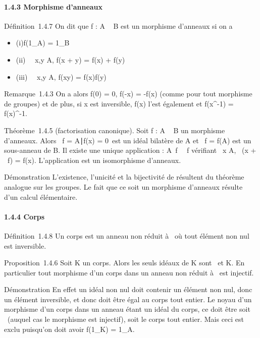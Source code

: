 \paragraph{1.4.3 Morphisme d'anneaux}

Définition~1.4.7 On dit que f : A \rightarrow~ B est un morphisme d'anneaux si on a

\begin{itemize}
\itemsep1pt\parskip0pt
\item
  (i)f(1_A) = 1_B
\item
  (ii) \forall~~x,y \in A, f(x + y) = f(x) + f(y)
\item
  (iii) \forall~~x,y \in A, f(xy) = f(x)f(y)
\end{itemize}

Remarque~1.4.3 On a alors f(0) = 0, f(-x) = -f(x) (comme pour tout
morphisme de groupes) et de plus, si x est inversible, f(x) l'est
également et f(x^-1) = f(x)^-1.

Théorème~1.4.5 (factorisation canonique). Soit f : A \rightarrow~ B un morphisme
d'anneaux. Alors
\mathrmKer~f =
\x \in A∣f(x) =
0\ est un idéal bilatère de A et
\mathrmIm~f = f(A) est un
sous-anneau de B. Il existe une unique application
\overlinef :
A\diagup\mathrmKer~f
\rightarrow~\mathrmIm~f vérifiant
\forall~x \in A, \overlinef~(x
+ \mathrmKer~f) = f(x).
L'application \overlinef est un isomorphisme
d'anneaux.

Démonstration L'existence, l'unicité et la bijectivité de
\overlinef résultent du théorème analogue sur les
groupes. Le fait que ce soit un morphisme d'anneaux résulte d'un calcul
élémentaire.

\paragraph{1.4.4 Corps}

Définition~1.4.8 Un corps est un anneau non réduit à
\0\ où tout élément non nul est
inversible.

Proposition~1.4.6 Soit K un corps. Alors les seuls idéaux de K sont
\0\ et K. En particulier tout
morphisme d'un corps dans un anneau non réduit à
\0\ est injectif.

Démonstration En effet un idéal non nul doit contenir un élément non
nul, donc un élément inversible, et donc doit être égal au corps tout
entier. Le noyau d'un morphisme d'un corps dans un anneau étant un idéal
du corps, ce doit être soit \0\
(auquel cas le morphisme est injectif), soit le corps tout entier. Mais
ceci est exclu puisqu'on doit avoir f(1_K) = 1_A.

